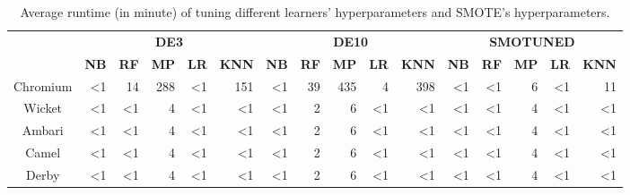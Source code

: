 \begin{table*}[!htbp]
\centering
\caption{Average runtime (in minute) of tuning different learners' hyperparameters and SMOTE's hyperparameters.}
\begin{tabular}{c|r|r|r|r|r|r|r|r|r|r|r|r|r|r|r}
\hline
\rowcolor[HTML]{EFEFEF} 
\cellcolor[HTML]{EFEFEF} & \multicolumn{5}{c|}{\cellcolor[HTML]{EFEFEF}\textbf{DE3}} & \multicolumn{5}{c|}{\cellcolor[HTML]{EFEFEF}\textbf{DE10}} & \multicolumn{5}{c}{\cellcolor[HTML]{EFEFEF}\textbf{SMOTUNED}} \\ \cline{2-16} 
\rowcolor[HTML]{EFEFEF} 
\multirow{-2}{*}{\cellcolor[HTML]{EFEFEF}\textbf{Project}} & \multicolumn{1}{c|}{\cellcolor[HTML]{EFEFEF}\textbf{NB}} & \multicolumn{1}{c|}{\cellcolor[HTML]{EFEFEF}\textbf{RF}} & \multicolumn{1}{c|}{\cellcolor[HTML]{EFEFEF}\textbf{MP}} & \multicolumn{1}{c|}{\cellcolor[HTML]{EFEFEF}\textbf{LR}} & \multicolumn{1}{c|}{\cellcolor[HTML]{EFEFEF}\textbf{KNN}} & \multicolumn{1}{c|}{\cellcolor[HTML]{EFEFEF}\textbf{NB}} & \multicolumn{1}{c|}{\cellcolor[HTML]{EFEFEF}\textbf{RF}} & \multicolumn{1}{c|}{\cellcolor[HTML]{EFEFEF}\textbf{MP}} & \multicolumn{1}{c|}{\cellcolor[HTML]{EFEFEF}\textbf{LR}} & \multicolumn{1}{c|}{\cellcolor[HTML]{EFEFEF}\textbf{KNN}} & \multicolumn{1}{c|}{\cellcolor[HTML]{EFEFEF}\textbf{NB}} & \multicolumn{1}{c|}{\cellcolor[HTML]{EFEFEF}\textbf{RF}} & \multicolumn{1}{c|}{\cellcolor[HTML]{EFEFEF}\textbf{MP}} & \multicolumn{1}{c|}{\cellcolor[HTML]{EFEFEF}\textbf{LR}} & \multicolumn{1}{c}{\cellcolor[HTML]{EFEFEF}\textbf{KNN}} \\ \hline
Chromium & \textless{}1 & 14 & 288 & \textless{}1 & 151 & \textless{}1 & 39 & 435 & 4 & 398 & \textless{}1 & \textless{}1 & 6 & \textless{}1 & 11 \\
Wicket & \textless{}1 & \textless{}1 & 4 & \textless{}1 & \textless{}1 & \textless{}1 & 2 & 6 & \textless{}1 & \textless{}1 & \textless{}1 & \textless{}1 & 4 & \textless{}1 & \textless{}1 \\ 
Ambari & \textless{}1 & \textless{}1 & 4 & \textless{}1 & \textless{}1 & \textless{}1 & 2 & 6 & \textless{}1 & \textless{}1 & \textless{}1 & \textless{}1 & 4 & \textless{}1 & \textless{}1 \\ 
Camel & \textless{}1 & \textless{}1 & 4 & \textless{}1 & \textless{}1 & \textless{}1 & 2 & 6 & \textless{}1 & \textless{}1 & \textless{}1 & \textless{}1 & 4 & \textless{}1 & \textless{}1 \\
Derby & \textless{}1 & \textless{}1 & 4 & \textless{}1 & \textless{}1 & \textless{}1 & 2 & 6 & \textless{}1 & \textless{}1 & \textless{}1 & \textless{}1 & 4 & \textless{}1 & \textless{}1 \\ \hline
\end{tabular}
\label{tbl:tuningtime}
\end{table*}

